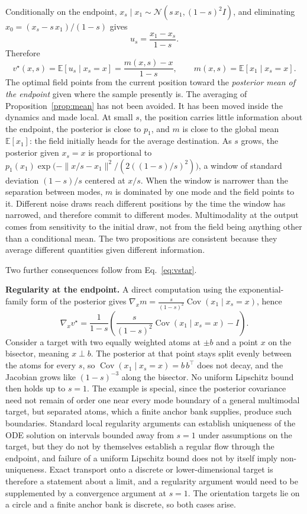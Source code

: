 \documentclass[11pt]{article}
\theoremstyle{plain}
\theoremstyle{remark}
\newcommand{\E}{\mathbb E}
\begin{document}
Conditionally on the endpoint, $x_s\mid x_1\sim\mathcal N(s\,x_1,(1-s)^2I)$, and eliminating $x_0=(x_s-s\,x_1)/(1-s)$ gives
\[
u_s=\frac{x_1-x_s}{1-s}.
\]
Therefore
\begin{equation}\label{eq:vstar}
v^\star(x,s)=\E[u_s\mid x_s=x]=\frac{m(x,s)-x}{1-s},\qquad m(x,s)=\E[x_1\mid x_s=x].
\end{equation}
The optimal field points from the current position toward the \emph{posterior mean of the endpoint} given where the sample presently is. The averaging of Proposition~\ref{prop:mean} has not been avoided. It has been moved inside the dynamics and made local. At small $s$, the position carries little information about the endpoint, the posterior is close to $p_1$, and $m$ is close to the global mean $\E[x_1]$: the field initially heads for the average destination. As $s$ grows, the posterior given $x_s=x$ is proportional to $p_1(x_1)\exp\!\big(-\|x/s-x_1\|^2/(2((1-s)/s)^2)\big)$, a window of standard deviation $(1-s)/s$ centered at $x/s$. When the window is narrower than the separation between modes, $m$ is dominated by one mode and the field points to it. Different noise draws reach different positions by the time the window has narrowed, and therefore commit to different modes. Multimodality at the output comes from sensitivity to the initial draw, not from the field being anything other than a conditional mean. The two propositions are consistent because they average different quantities given different information.

Two further consequences follow from Eq.~\eqref{eq:vstar}.

\textbf{Regularity at the endpoint.} A direct computation using the exponential-family form of the posterior gives $\nabla_x m=\frac{s}{(1-s)^2}\operatorname{Cov}(x_1\mid x_s=x)$, hence
\[
\nabla_x v^\star=\frac{1}{1-s}\left(\frac{s}{(1-s)^2}\operatorname{Cov}(x_1\mid x_s=x)-I\right).
\]
Consider a target with two equally weighted atoms at $\pm b$ and a point $x$ on the bisector, meaning $x\perp b$. The posterior at that point stays split evenly between the atoms for every $s$, so $\operatorname{Cov}(x_1\mid x_s=x)=b\,b^\top$ does not decay, and the Jacobian grows like $(1-s)^{-3}$ along the bisector. No uniform Lipschitz bound then holds up to $s=1$. The example is special, since the posterior covariance need not remain of order one near every mode boundary of a general multimodal target, but separated atoms, which a finite anchor bank supplies, produce such boundaries. Standard local regularity arguments can establish uniqueness of the ODE solution on intervals bounded away from $s=1$ under assumptions on the target, but they do not by themselves establish a regular flow through the endpoint, and failure of a uniform Lipschitz bound does not by itself imply non-uniqueness. Exact transport onto a discrete or lower-dimensional target is therefore a statement about a limit, and a regularity argument would need to be supplemented by a convergence argument at $s=1$. The orientation targets lie on a circle and a finite anchor bank is discrete, so both cases arise.
\end{document}
